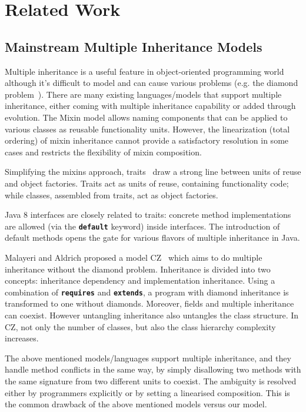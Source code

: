 \section{Related Work}

\subsection{Mainstream Multiple Inheritance Models}
Multiple inheritance is a useful feature in object-oriented programming world although it's difficult to model and can 
cause various problems (e.g. the diamond problem~\cite{Sak89dis,Singh1995}).  There are many existing languages/models that support multiple 
inheritance, either coming with multiple inheritance capability or added through evolution. The Mixin model allows naming components 
that can be applied to various classes as reusable functionality units. However, the linearization (total ordering) of mixin 
inheritance cannot provide a satisfactory resolution in some cases and restricts the flexibility of mixin composition. 

Simplifying the mixins approach, traits~\cite{scharli03traits} draw a strong line between units of reuse and object factories. 
Traits act as units of reuse, containing functionality code; while classes, assembled from traits, act as object factories. 

Java 8 interfaces are closely related to traits: concrete method implementations are allowed (via the \textbf{\texttt{default}} keyword) inside interfaces. 
The introduction of default methods opens the gate for various flavors of multiple inheritance in Java.

Malayeri and Aldrich proposed a model CZ~\cite{malayeri2009cz} which aims to do multiple inheritance without the diamond problem. 
Inheritance is divided into two concepts: inheritance dependency and implementation inheritance. 
Using a combination of \textbf{\texttt{requires}} and \textbf{\texttt{extends}}, a program with 
diamond inheritance is transformed to one without diamonds. Moreover, fields and multiple inheritance can coexist. 
However untangling inheritance also untangles the class structure. In CZ, not only the number of classes, but also 
the class hierarchy complexity increases. 

The above mentioned models/languages support multiple inheritance, and they handle method conflicts in the same way, by
simply disallowing two methods with the same signature from two different units to coexist. The ambiguity is resolved either
by programmers explicitly or by setting a linearised composition. This is the common drawback of the above mentioned models versus our model.

